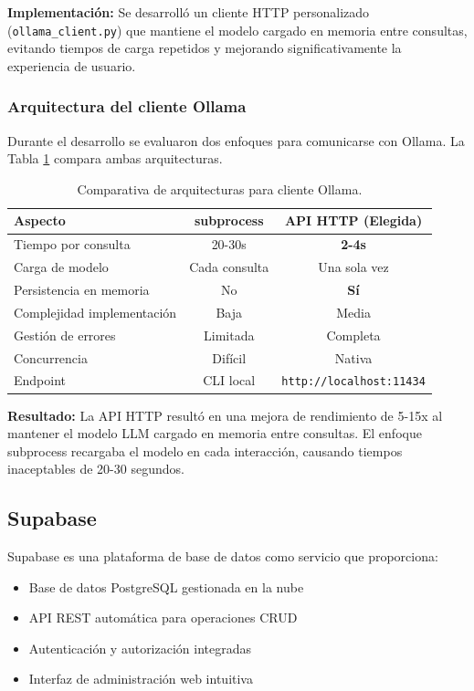 \textbf{Implementación:} Se desarrolló un cliente HTTP personalizado (\texttt{ollama\_client.py}) que mantiene el modelo cargado en memoria entre consultas, evitando tiempos de carga repetidos y mejorando significativamente la experiencia de usuario.

\subsubsection{Arquitectura del cliente Ollama}

Durante el desarrollo se evaluaron dos enfoques para comunicarse con Ollama. La Tabla \ref{tab:comp-ollama-client} compara ambas arquitecturas.

\begin{table}[h]
\centering
\begin{tabular}{|l|c|c|}
\hline
\textbf{Aspecto} & \textbf{subprocess} & \textbf{API HTTP (Elegida)} \\ \hline
Tiempo por consulta & 20-30s & \textbf{2-4s} \\ \hline
Carga de modelo & Cada consulta & Una sola vez \\ \hline
Persistencia en memoria & No & \textbf{Sí} \\ \hline
Complejidad implementación & Baja & Media \\ \hline
Gestión de errores & Limitada & Completa \\ \hline
Concurrencia & Difícil & Nativa \\ \hline
Endpoint & CLI local & \texttt{http://localhost:11434} \\ \hline
\end{tabular}
\caption{Comparativa de arquitecturas para cliente Ollama.}
\label{tab:comp-ollama-client}
\end{table}

\textbf{Resultado:} La API HTTP resultó en una mejora de rendimiento de 5-15x al mantener el modelo LLM cargado en memoria entre consultas. El enfoque subprocess recargaba el modelo en cada interacción, causando tiempos inaceptables de 20-30 segundos.

\subsection{Supabase}

Supabase es una plataforma de base de datos como servicio que proporciona:

\begin{itemize}
    \item Base de datos PostgreSQL gestionada en la nube
    \item API REST automática para operaciones CRUD
    \item Autenticación y autorización integradas
    \item Interfaz de administración web intuitiva
\end{itemize}

